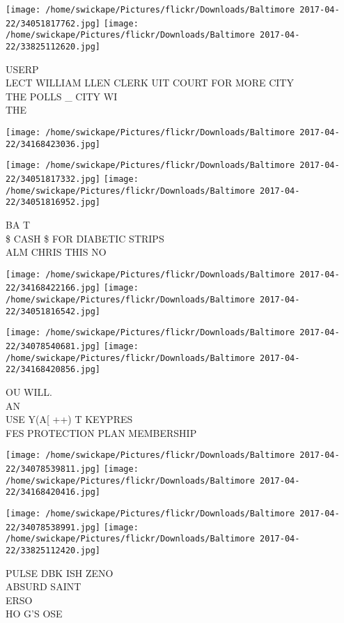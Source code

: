 \documentclass[10pt,letterpaper]{article}
\begin{document}
\texttt{[image: /home/swickape/Pictures/flickr/Downloads/Baltimore 2017-04-22/34051817762.jpg]}
\texttt{[image: /home/swickape/Pictures/flickr/Downloads/Baltimore 2017-04-22/33825112620.jpg]}

USERP\\
LECT WILLIAM LLEN CLERK UIT COURT FOR MORE CITY\\
THE POLLS \_ CITY WI\\
THE
\pagebreak

\texttt{[image: /home/swickape/Pictures/flickr/Downloads/Baltimore 2017-04-22/34168423036.jpg]}

\vspace{0.25in}
\texttt{[image: /home/swickape/Pictures/flickr/Downloads/Baltimore 2017-04-22/34051817332.jpg]}
\texttt{[image: /home/swickape/Pictures/flickr/Downloads/Baltimore 2017-04-22/34051816952.jpg]}

BA T\\
\$ CASH \$ FOR DIABETIC STRIPS\\
ALM CHRIS THIS NO
\pagebreak

\texttt{[image: /home/swickape/Pictures/flickr/Downloads/Baltimore 2017-04-22/34168422166.jpg]}
\texttt{[image: /home/swickape/Pictures/flickr/Downloads/Baltimore 2017-04-22/34051816542.jpg]}

\texttt{[image: /home/swickape/Pictures/flickr/Downloads/Baltimore 2017-04-22/34078540681.jpg]}
\texttt{[image: /home/swickape/Pictures/flickr/Downloads/Baltimore 2017-04-22/34168420856.jpg]}

OU WILL.\\
AN\\
USE Y(A{[} ++) T KEYPRES\\
FES PROTECTION PLAN MEMBERSHIP
\pagebreak

\texttt{[image: /home/swickape/Pictures/flickr/Downloads/Baltimore 2017-04-22/34078539811.jpg]}
\texttt{[image: /home/swickape/Pictures/flickr/Downloads/Baltimore 2017-04-22/34168420416.jpg]}

\texttt{[image: /home/swickape/Pictures/flickr/Downloads/Baltimore 2017-04-22/34078538991.jpg]}
\texttt{[image: /home/swickape/Pictures/flickr/Downloads/Baltimore 2017-04-22/33825112420.jpg]}

PULSE DBK ISH ZENO\\
ABSURD SAINT\\
ERSO\\
HO G'S OSE
\pagebreak
\end{document}
